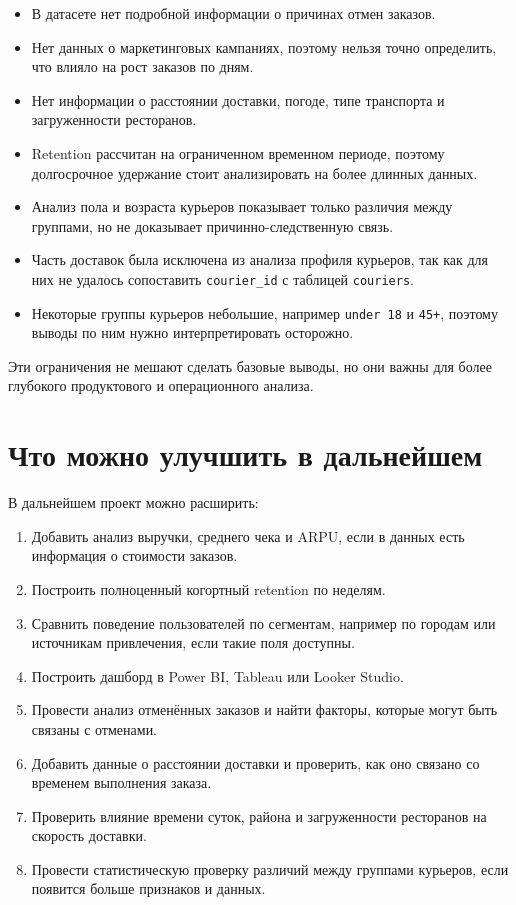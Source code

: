 \documentclass[12pt,a4paper]{article}
\begin{document}
\begin{itemize}
    \item В датасете нет подробной информации о причинах отмен заказов.
    \item Нет данных о маркетинговых кампаниях, поэтому нельзя точно определить, что влияло на рост заказов по дням.
    \item Нет информации о расстоянии доставки, погоде, типе транспорта и загруженности ресторанов.
    \item Retention рассчитан на ограниченном временном периоде, поэтому долгосрочное удержание стоит анализировать на более длинных данных.
    \item Анализ пола и возраста курьеров показывает только различия между группами, но не доказывает причинно-следственную связь.
    \item Часть доставок была исключена из анализа профиля курьеров, так как для них не удалось сопоставить \texttt{courier\_id} с таблицей \texttt{couriers}.
    \item Некоторые группы курьеров небольшие, например \texttt{under 18} и \texttt{45+}, поэтому выводы по ним нужно интерпретировать осторожно.
\end{itemize}

Эти ограничения не мешают сделать базовые выводы, но они важны для более глубокого продуктового и операционного анализа.

\section{Что можно улучшить в дальнейшем}

В дальнейшем проект можно расширить:

\begin{enumerate}
    \item Добавить анализ выручки, среднего чека и ARPU, если в данных есть информация о стоимости заказов.
    \item Построить полноценный когортный retention по неделям.
    \item Сравнить поведение пользователей по сегментам, например по городам или источникам привлечения, если такие поля доступны.
    \item Построить дашборд в Power BI, Tableau или Looker Studio.
    \item Провести анализ отменённых заказов и найти факторы, которые могут быть связаны с отменами.
    \item Добавить данные о расстоянии доставки и проверить, как оно связано со временем выполнения заказа.
    \item Проверить влияние времени суток, района и загруженности ресторанов на скорость доставки.
    \item Провести статистическую проверку различий между группами курьеров, если появится больше признаков и данных.
\end{enumerate}
\end{document}
